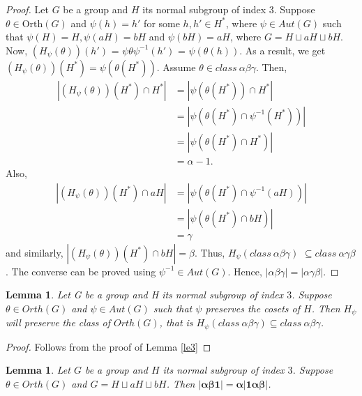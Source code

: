 \documentclass[11pt,a4paper]{article}
\newtheorem{lemma}[theorem]{Lemma}
\theoremstyle{definition}
\theoremstyle{remark}
\begin{document}
	\begin{proof}
		Let $G$ be a group and $H$ its normal subgroup of index $3$. Suppose $\theta \in \text{Orth}(G)$ and $\psi(h) = h'$ for some $h,h' \in H^{\ast}$, where $\psi \in Aut(G)$ such that $\psi(H) = H, \psi(aH) = bH$ and $\psi(bH) = aH$, where $G = H \sqcup aH \sqcup bH.$ Now, $(H_{\psi}(\theta))(h')$ = $\psi \theta \psi^{-1}(h')$ = $\psi (\theta(h))$. As a result, we get $(H_{\psi}(\theta))(H^{\ast}) = \psi(\theta(H^{\ast}))$. 		
		 Assume $\theta \in class~\alpha \beta \gamma$. Then, 
		 \begin{align*}
		 	|(H_{\psi}(\theta))(H^{\ast})\cap H^{\ast}|
		 	& =|\psi(\theta(H^{\ast})) \cap H^{\ast}|\\
		 	  &=|\psi(\theta(H^{\ast})\cap \psi^{-1}(H^{\ast}))| \\ &=|\psi(\theta(H^{\ast})\cap H^{\ast})|\\& = \alpha - 1.
		 \end{align*} 
		   Also, 
		   \begin{align*}
		   |(H_{\psi}(\theta))(H^{\ast})\cap aH| &= |\psi(\theta(H^{\ast})\cap \psi^{-1}(aH))|\\& = |\psi(\theta(H^{\ast}) \cap bH)|\\& = \gamma
		\end{align*}
		     and similarly, $|(H_{\psi}(\theta))(H^{\ast})\cap bH|=\beta$.
		     Thus, $H_{\psi}(class~\alpha \beta \gamma)$ $ \subseteq class~\alpha \gamma \beta$.
		      The converse can be proved using $\psi^{-1} \in Aut(G)$. Hence, $|\alpha \beta \gamma| = |\alpha \gamma \beta|.$
	\end{proof}
	\begin{lemma}\label{le5}
		Let G be a group and H its normal subgroup of index $3$. Suppose $\theta \in Orth(G)$ and $\psi \in Aut(G)$ such that $\psi$ preserves the cosets of $H$. Then $H_{\psi}$ will preserve the class of $Orth(G)$, that is $H_{\psi}(class~\alpha\beta\gamma) \subseteq class~\alpha\beta\gamma$. 
	\end{lemma}
	\begin{proof}
		Follows from the proof of Lemma \ref{le3}
	\end{proof}
	\begin{lemma}\label{le4}
		Let $G$ be a group and $H$ its normal subgroup of index $3$. Suppose $\theta \in Orth(G)$ and $G = H \sqcup aH \sqcup bH$. Then $\bm{|\alpha \beta 1| = \alpha |1 \alpha \beta|}$.
	\end{lemma}
\end{document}
